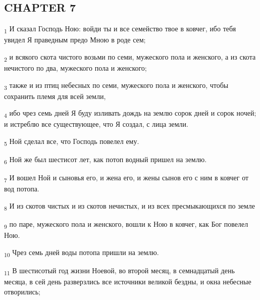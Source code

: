 \subsection{CHAPTER 7}
\begin{tcolorbox}
\textsubscript{1} И сказал Господь Ною: войди ты и все семейство твое в ковчег, ибо тебя увидел Я праведным предо Мною в роде сем;
\end{tcolorbox}
\begin{tcolorbox}
\textsubscript{2} и всякого скота чистого возьми по семи, мужеского пола и женского, а из скота нечистого по два, мужеского пола и женского;
\end{tcolorbox}
\begin{tcolorbox}
\textsubscript{3} также и из птиц небесных по семи, мужеского пола и женского, чтобы сохранить племя для всей земли,
\end{tcolorbox}
\begin{tcolorbox}
\textsubscript{4} ибо чрез семь дней Я буду изливать дождь на землю сорок дней и сорок ночей; и истреблю все существующее, что Я создал, с лица земли.
\end{tcolorbox}
\begin{tcolorbox}
\textsubscript{5} Ной сделал все, что Господь повелел ему.
\end{tcolorbox}
\begin{tcolorbox}
\textsubscript{6} Ной же был шестисот лет, как потоп водный пришел на землю.
\end{tcolorbox}
\begin{tcolorbox}
\textsubscript{7} И вошел Ной и сыновья его, и жена его, и жены сынов его с ним в ковчег от вод потопа.
\end{tcolorbox}
\begin{tcolorbox}
\textsubscript{8} И из скотов чистых и из скотов нечистых, и из всех пресмыкающихся по земле
\end{tcolorbox}
\begin{tcolorbox}
\textsubscript{9} по паре, мужеского пола и женского, вошли к Ною в ковчег, как Бог повелел Ною.
\end{tcolorbox}
\begin{tcolorbox}
\textsubscript{10} Чрез семь дней воды потопа пришли на землю.
\end{tcolorbox}
\begin{tcolorbox}
\textsubscript{11} В шестисотый год жизни Ноевой, во второй месяц, в семнадцатый день месяца, в сей день разверзлись все источники великой бездны, и окна небесные отворились;
\end{tcolorbox}
